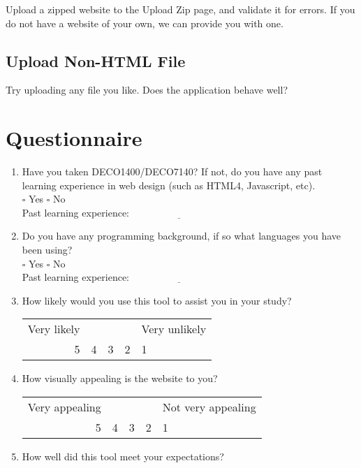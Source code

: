 \documentclass[10pt]{article}
\begin{document}
Upload a zipped website to the Upload Zip page, and validate it for errors. If you do not have a website of your own, we can provide you with one.

\subsection*{Upload Non-HTML File}

Try uploading any file you like. Does the application behave well?

\newpage
\section*{Questionnaire}

\begin{enumerate}
\item Have you taken DECO1400/DECO7140? If not, do you have any past learning experience in web design (such as HTML4, Javascript, etc). \\ $\square$ Yes $\square$ No \\ Past learning experience: $\underline{\hspace{4cm}}$
\item Do you have any programming background, if so what languages you have been using? \\ $\square$ Yes $\square$ No \\ Past learning experience: $\underline{\hspace{4cm}}$
\item How likely would you use this tool to assist you in your study? \\ 
\begin{center}
\begin{tabular}{r | c | c | c | l}
Very likely & ~ & ~ & ~ & Very unlikely \\
5 & 4 & 3 & 2 & 1
\end{tabular}
\end{center}
\item How visually appealing is the website to you? \\
\begin{center}
\begin{tabular}{r | c | c | c | l}
Very appealing & ~ & ~ & ~ & Not very appealing \\
5 & 4 & 3 & 2 & 1
\end{tabular}
\end{center}
\item How well did this tool meet your expectations? \\

\end{enumerate}
\end{document}
